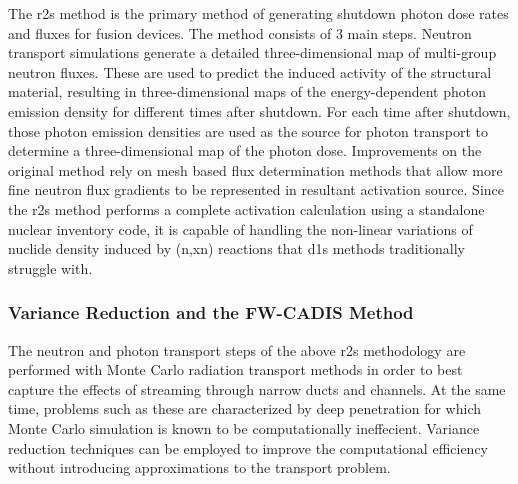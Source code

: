 \documentclass[12pt]{article}
\begin{document}
The \gls{r2s} method \cite{r2s} is the primary method of generating shutdown
photon dose rates and fluxes for fusion devices. The method consists of 3 main
steps.  Neutron transport simulations generate a detailed three-dimensional
map of multi-group neutron fluxes.  These are used to predict the induced
activity of the structural material, resulting in three-dimensional maps of
the energy-dependent photon emission density for different times after
shutdown.  For each time after shutdown, those photon emission densities are
used as the source for photon transport to determine a three-dimensional map
of the photon dose.  Improvements on the original method rely on mesh based
flux determination methods \cite{mcr2s,r2smesh,r2suned,pyne_r2s} that allow
more fine neutron flux gradients to be represented in resultant activation
source.  Since the \gls{r2s} method performs a complete activation calculation
using a standalone nuclear inventory code, it is capable of handling the
non-linear variations of nuclide density induced by (n,xn) reactions
that \gls{d1s} methods traditionally struggle with.

\subsubsection{Variance Reduction and the FW-CADIS Method}

The neutron and photon transport steps of the above \gls{r2s} methodology are
performed with Monte Carlo radiation transport methods in order to best
capture the effects of streaming through narrow ducts and channels.  At the
same time, problems such as these are characterized by deep penetration for
which Monte Carlo simulation is known to be computationally ineffecient.
Variance reduction techniques can be employed to improve the computational
efficiency without introducing approximations to the transport problem.
\end{document}
